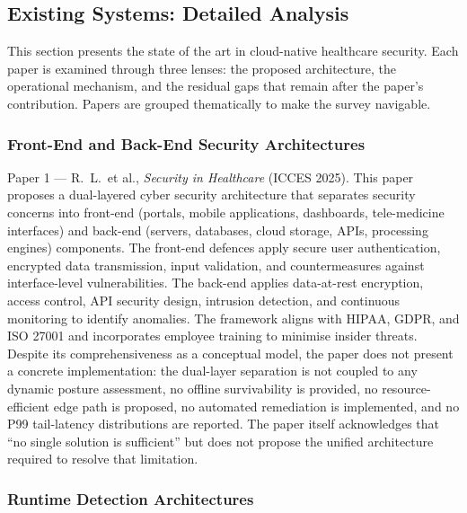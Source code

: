\subsection{Existing Systems: Detailed Analysis}
\label{subsec:paperanalysis}

This section presents the state of the art in cloud-native healthcare security. Each paper is examined through three lenses: the proposed architecture, the operational mechanism, and the residual gaps that remain after the paper's contribution. Papers are grouped thematically to make the survey navigable.

\subsubsection{Front-End and Back-End Security Architectures}

{Paper 1 --- R.~L.~et al., \textit{Security in Healthcare} (ICCES 2025).} This paper proposes a dual-layered cyber security architecture that separates security concerns into front-end (portals, mobile applications, dashboards, tele-medicine interfaces) and back-end (servers, databases, cloud storage, APIs, processing engines) components. The front-end defences apply secure user authentication, encrypted data transmission, input validation, and countermeasures against interface-level vulnerabilities. The back-end applies data-at-rest encryption, access control, API security design, intrusion detection, and continuous monitoring to identify anomalies. The framework aligns with HIPAA, GDPR, and ISO 27001 and incorporates employee training to minimise insider threats. Despite its comprehensiveness as a conceptual model, the paper does not present a concrete implementation: the dual-layer separation is not coupled to any dynamic posture assessment, no offline survivability is provided, no resource-efficient edge path is proposed, no automated remediation is implemented, and no P99 tail-latency distributions are reported. The paper itself acknowledges that ``no single solution is sufficient'' but does not propose the unified architecture required to resolve that limitation.

\subsubsection{Runtime Detection Architectures}

